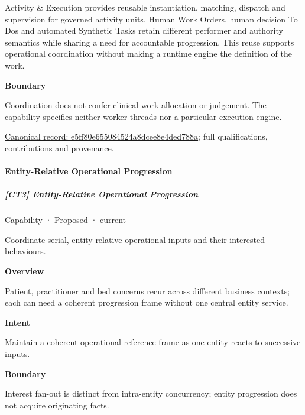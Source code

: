 Activity \& Execution provides reusable instantiation, matching, dispatch and supervision for governed activity units. Human Work Orders, human decision To Dos and automated Synthetic Tasks retain different performer and authority semantics while sharing a need for accountable progression. This reuse supports operational coordination without making a runtime engine the definition of the work.



\textbf{Boundary}



Coordination does not confer clinical work allocation or judgement. The capability specifies neither worker threads nor a particular execution engine.


{\footnotesize \href{../../../../continuum/strategy/capability/e5ff80e655084524a8dcee8e4ded788a.md}{Canonical record: e5ff80e655084524a8dcee8e4ded788a}; full qualifications, contributions and provenance.}\par
\paragraph{Entity-Relative Operational Progression}

\subparagraph{[CT3] Entity-Relative Operational Progression}

\label{element:69c82474fb534152b151c92f706197d0}
{\small Capability · Proposed · current}\par

Coordinate serial, entity-relative operational inputs and their interested behaviours.



\textbf{Overview}



Patient, practitioner and bed concerns recur across different business contexts; each can need a coherent progression frame without one central entity service.



\textbf{Intent}



Maintain a coherent operational reference frame as one entity reacts to successive inputs.



\textbf{Boundary}



Interest fan-out is distinct from intra-entity concurrency; entity progression does not acquire originating facts.


